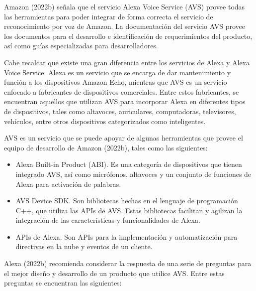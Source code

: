 Amazon (2022b) señala que el servicio Alexa Voice Service (AVS) provee todas las herramientas para poder integrar de forma correcta el servicio de reconocimiento por voz de Amazon. La documentación del servicio AVS provee los documentos para el desarrollo e identificación de requerimientos del producto, así como guías especializadas para desarrolladores.

Cabe recalcar que existe una gran diferencia entre los servicios de Alexa y Alexa Voice Service. Alexa es un servicio que se encarga de dar mantenimiento y función a los dispositivos Amazon Echo, mientras que AVS es un servicio enfocado a fabricantes de dispositivos comerciales. Entre estos fabricantes, se encuentran aquellos que utilizan AVS para incorporar Alexa en diferentes tipos de dispositivos, tales como altavoces, auriculares, computadoras, televisores, vehículos, entre otros dispositivos categorizados como inteligentes.

AVS es un servicio que se puede apoyar de algunas herramientas que provee el equipo de desarrollo de Amazon (2022b), tales como las siguientes:

\begin{itemize}
  \item Alexa Built-in Product (ABI). Es una categoría de dispositivos que tienen integrado AVS, así como micrófonos, altavoces y un conjunto de funciones de Alexa para activación de palabras.
  \item AVS Device SDK. Son bibliotecas hechas en el lenguaje de programación C++, que utiliza las APIs de AVS. Estas bibliotecas facilitan y agilizan la integración de las características y funcionalidades de Alexa.
  \item APIs de Alexa. Son APIs para la implementación y automatización para directivas en la nube y eventos de un cliente.
\end{itemize}

Alexa (2022b) recomienda considerar la respuesta de una serie de preguntas para el mejor diseño y desarrollo de un producto que utilice AVS. Entre estas preguntas se encuentran las siguientes:

